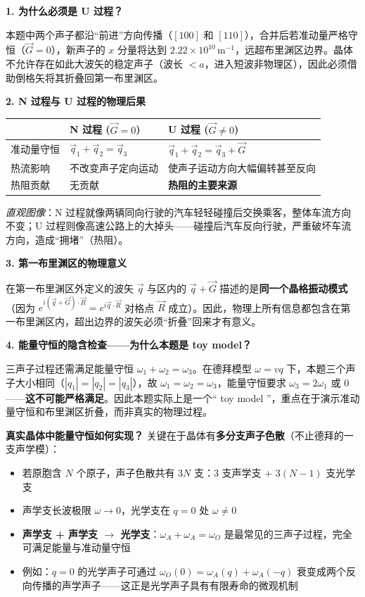 \begin{insightbox}[物理图像与概念深化]
\textbf{1. 为什么必须是 U 过程？}

本题中两个声子都沿``前进''方向传播（$[100]$ 和 $[110]$），合并后若准动量严格守恒（$\vec G=0$），新声子的 $x$ 分量将达到 $2.22\times10^{10}\,\mathrm{m^{-1}}$，远超布里渊区边界。晶体不允许存在如此大波矢的稳定声子（波长 $<a$，进入短波非物理区），因此必须借助倒格矢将其折叠回第一布里渊区。

\textbf{2. N 过程与 U 过程的物理后果}

\begin{center}
\begin{tabular}{lll}
\toprule
 & \textbf{N 过程} ($\vec G=0$) & \textbf{U 过程} ($\vec G\neq0$) \\
\midrule
准动量守恒 & $\vec q_1+\vec q_2=\vec q_3$ & $\vec q_1+\vec q_2=\vec q_3+\vec G$ \\
热流影响 & 不改变声子定向运动 & 使声子运动方向大幅偏转甚至反向 \\
热阻贡献 & 无贡献 & \textbf{热阻的主要来源} \\
\bottomrule
\end{tabular}
\end{center}

\textit{直观图像}：N 过程就像两辆同向行驶的汽车轻轻碰撞后交换乘客，整体车流方向不变；U 过程则像高速公路上的大掉头——碰撞后汽车反向行驶，严重破坏车流方向，造成``拥堵''（热阻）。

\textbf{3. 第一布里渊区的物理意义}

在第一布里渊区外定义的波矢 $\vec q$ 与区内的 $\vec q+\vec G$ 描述的是\textbf{同一个晶格振动模式}（因为 $e^{i(\vec q+\vec G)\cdot\vec R}=e^{i\vec q\cdot\vec R}$ 对格点 $\vec R$ 成立）。因此，物理上所有信息都包含在第一布里渊区内，超出边界的波矢必须``折叠''回来才有意义。

\textbf{4. 能量守恒的隐含检查——为什么本题是 toy model？}

三声子过程还需满足能量守恒 $\omega_1+\omega_2=\omega_3$。在德拜模型 $\omega=vq$ 下，本题三个声子大小相同（$|q_1|=|q_2|=|q_3|$），故 $\omega_1=\omega_2=\omega_3$，能量守恒要求 $\omega_3=2\omega_1$ 或 $0$——\textbf{这不可能严格满足}。因此本题实际上是一个`` toy model ''，重点在于演示准动量守恒和布里渊区折叠，而非真实的物理过程。

\textbf{真实晶体中能量守恒如何实现？} 关键在于晶体有\textbf{多分支声子色散}（不止德拜的一支声学模）：
\begin{itemize}
    \item 若原胞含 $N$ 个原子，声子色散共有 $3N$ 支：3 支声学支 + $3(N-1)$ 支光学支
    \item 声学支长波极限 $\omega\to0$，光学支在 $q=0$ 处 $\omega\neq0$
    \item \textbf{声学支 + 声学支 $\to$ 光学支}：$\omega_A+\omega_A=\omega_O$ 是最常见的三声子过程，完全可满足能量与准动量守恒
    \item 例如：$q=0$ 的光学声子可通过 $\omega_O(0)=\omega_A(q)+\omega_A(-q)$ 衰变成两个反向传播的声学声子——这正是光学声子具有有限寿命的微观机制
\end{itemize}


\end{insightbox}
